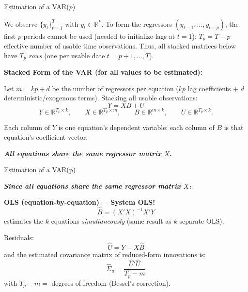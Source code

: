 \documentclass{beamer}
\begin{document}
\begin{frame}{Estimation of a VAR($p$)}

We observe $\{y_t\}_{t=1}^T$ with $y_t\in\mathbb{R}^k$.  To form the regressors $(y_{t-1},\dots,y_{t-p})$, the first $p$ periods cannot be used (needed to initialize lags at $t=1$): $T_p = T - p$ effective number of usable time observations.
\medskip
Thus, all stacked matrices below have \emph{$T_p$ rows} (one per usable date $t=p+1,\dots,T$).
\bigskip

\textbf{Stacked Form of the VAR (for all values to be estimated):}

Let $m = kp + d$ be the number of regressors per equation ($kp$ lag coefficients + $d$ deterministic/exogenous terms). Stacking all usable observations:
\[
Y = X B + U
\]
\[
Y \in\mathbb{R}^{T_p\times k},\qquad
X \in\mathbb{R}^{T_p\times m},\qquad
B\in\mathbb{R}^{m\times k},\qquad
U\in\mathbb{R}^{T_p\times k}.
\]

Each column of $Y$ is one equation’s dependent variable; each column of $B$ is that equation’s coefficient vector.  
\bigskip

\textbf{\emph{All equations share the same regressor matrix $X$}.}
\end{frame}

\begin{frame}{Estimation of a VAR(p)}

\textbf{\emph{Since all equations share the same regressor matrix $X$:}}

\textbf{OLS (equation-by-equation) = System OLS!}  
\[
\widehat{B} = (X' X)^{-1} X' Y
\]
estimates the $k$ equations \emph{simultaneously} (same result as $k$ separate OLS).

\medskip

Residuals:
\[
\widehat{U} = Y - X\widehat{B}
\]
and the estimated covariance matrix of reduced-form innovations is:
\[
\widehat{\Sigma}_u = \frac{\widehat{U}' \widehat{U}}{T_p - m}
\]
with $T_p - m =$ degrees of freedom (Bessel's correction).
\end{frame}
\end{document}
